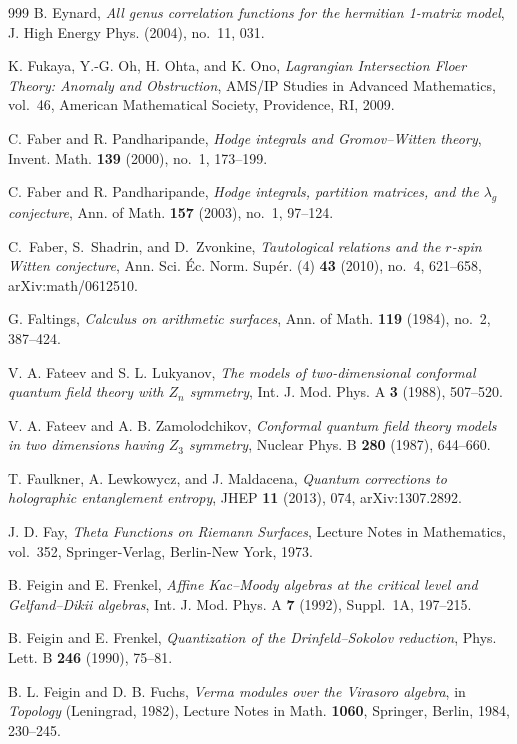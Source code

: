 \begin{thebibliography}{999}
B. Eynard, \emph{All genus correlation functions for the hermitian 1-matrix model}, J. High Energy Phys. (2004), no.~11, 031.

K. Fukaya, Y.-G. Oh, H. Ohta, and K. Ono, \emph{Lagrangian Intersection {F}loer Theory: Anomaly and Obstruction}, AMS/IP Studies in Advanced Mathematics, vol.~46, American Mathematical Society, Providence, RI, 2009.

C. Faber and R. Pandharipande, \emph{Hodge integrals and Gromov--Witten theory}, Invent. Math. \textbf{139} (2000), no.~1, 173--199.

C. Faber and R. Pandharipande, \emph{Hodge integrals, partition matrices, and the $\lambda_g$ conjecture}, Ann. of Math. \textbf{157} (2003), no.~1, 97--124.

C.~Faber, S.~Shadrin, and D.~Zvonkine, \emph{Tautological relations and the $r$-spin Witten conjecture}, Ann. Sci. \'Ec. Norm. Sup\'er. (4) \textbf{43} (2010), no.~4, 621--658, arXiv:math/0612510.

G. Faltings, \emph{Calculus on arithmetic surfaces}, Ann. of Math. \textbf{119} (1984), no.~2, 387--424.

V. A. Fateev and S. L. Lukyanov, \emph{The models of two-dimensional conformal quantum field theory with $Z_n$ symmetry}, Int. J. Mod. Phys. A \textbf{3} (1988), 507--520.

V. A. Fateev and A. B. Zamolodchikov, \emph{Conformal quantum field theory models in two dimensions having $Z_3$ symmetry}, Nuclear Phys. B \textbf{280} (1987), 644--660.

T. Faulkner, A. Lewkowycz, and J. Maldacena, \emph{Quantum corrections to holographic entanglement entropy}, JHEP \textbf{11} (2013), 074, arXiv:1307.2892.

J. D. Fay, \emph{Theta Functions on Riemann Surfaces}, Lecture Notes in Mathematics, vol.~352, Springer-Verlag, Berlin-New York, 1973.

B. Feigin and E. Frenkel, \emph{Affine Kac--Moody algebras at the critical level and Gelfand--Dikii algebras}, Int. J. Mod. Phys. A \textbf{7} (1992), Suppl.~1A, 197--215.

B. Feigin and E. Frenkel, \emph{Quantization of the Drinfeld--Sokolov reduction}, Phys. Lett. B \textbf{246} (1990), 75--81.

B. L. Feigin and D. B. Fuchs, \emph{Verma modules over the Virasoro algebra}, in \emph{Topology} (Leningrad, 1982), Lecture Notes in Math. \textbf{1060}, Springer, Berlin, 1984, 230--245.


\end{thebibliography}
